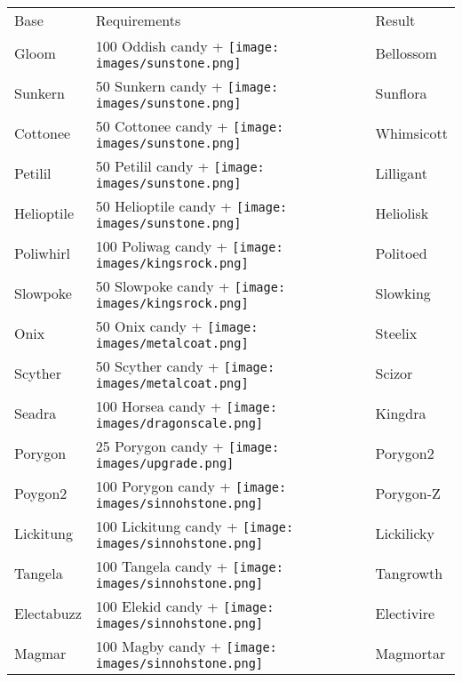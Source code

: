 \begin{table}
\footnotesize
\centering
  \begin{tabular}{lll}
    Base & Requirements & Result \\
    \Midrule
    Gloom & 100 Oddish candy + \texttt{[image: images/sunstone.png]} & Bellossom \\
    Sunkern & 50 Sunkern candy + \texttt{[image: images/sunstone.png]} & Sunflora \\
    Cottonee & 50 Cottonee candy + \texttt{[image: images/sunstone.png]} & Whimsicott \\
    Petilil & 50 Petilil candy + \texttt{[image: images/sunstone.png]} & Lilligant \\
    Helioptile & 50 Helioptile candy + \texttt{[image: images/sunstone.png]} & Heliolisk \\
    Poliwhirl & 100 Poliwag candy + \texttt{[image: images/kingsrock.png]} & Politoed \\
    Slowpoke & 50 Slowpoke candy + \texttt{[image: images/kingsrock.png]} & Slowking \\
    Onix & 50 Onix candy + \texttt{[image: images/metalcoat.png]} & Steelix \\
    Scyther & 50 Scyther candy + \texttt{[image: images/metalcoat.png]} & Scizor \\
    Seadra & 100 Horsea candy + \texttt{[image: images/dragonscale.png]} & Kingdra \\
    Porygon & 25 Porygon candy + \texttt{[image: images/upgrade.png]} & Porygon2 \\
    Poygon2 & 100 Porygon candy + \texttt{[image: images/sinnohstone.png]} & Porygon-Z \\
    Lickitung & 100 Lickitung candy + \texttt{[image: images/sinnohstone.png]} & Lickilicky \\
    Tangela	& 100 Tangela candy + \texttt{[image: images/sinnohstone.png]} & Tangrowth \\
    Electabuzz & 100 Elekid candy + \texttt{[image: images/sinnohstone.png]} & Electivire	\\
    Magmar & 100 Magby candy + \texttt{[image: images/sinnohstone.png]} & Magmortar	\\

\end{tabular}
\end{table}

